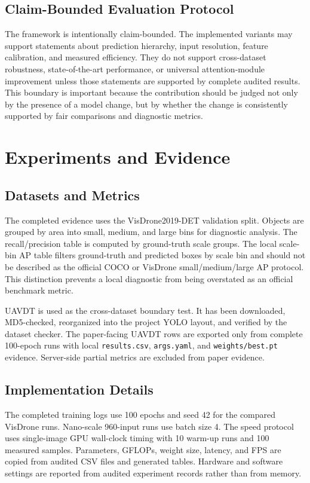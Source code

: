 \documentclass[journal]{IEEEtran}
\begin{document}
\subsection{Claim-Bounded Evaluation Protocol}

The framework is intentionally claim-bounded. The implemented variants may support statements about prediction hierarchy, input resolution, feature calibration, and measured efficiency. They do not support cross-dataset robustness, state-of-the-art performance, or universal attention-module improvement unless those statements are supported by complete audited results. This boundary is important because the contribution should be judged not only by the presence of a model change, but by whether the change is consistently supported by fair comparisons and diagnostic metrics.

\section{Experiments and Evidence}

\subsection{Datasets and Metrics}

The completed evidence uses the VisDrone2019-DET validation split. Objects are grouped by area into small, medium, and large bins for diagnostic analysis. The recall/precision table is computed by ground-truth scale groups. The local scale-bin AP table filters ground-truth and predicted boxes by scale bin and should not be described as the official COCO or VisDrone small/medium/large AP protocol. This distinction prevents a local diagnostic from being overstated as an official benchmark metric.

UAVDT is used as the cross-dataset boundary test. It has been downloaded, MD5-checked, reorganized into the project YOLO layout, and verified by the dataset checker. The paper-facing UAVDT rows are exported only from complete 100-epoch runs with local \texttt{results.csv}, \texttt{args.yaml}, and \texttt{weights/best.pt} evidence. Server-side partial metrics are excluded from paper evidence.

\subsection{Implementation Details}

The completed training logs use 100 epochs and seed 42 for the compared VisDrone runs. Nano-scale 960-input runs use batch size 4. The speed protocol uses single-image GPU wall-clock timing with 10 warm-up runs and 100 measured samples. Parameters, GFLOPs, weight size, latency, and FPS are copied from audited CSV files and generated tables. Hardware and software settings are reported from audited experiment records rather than from memory.
\end{document}
